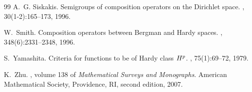 \documentclass[11pt]{amsart}
\numberwithin{equation}{section}
\theoremstyle{definition}
\begin{document}
\begin{thebibliography}{99}
		A.~G. Siskakis.
		\newblock Semigroups of composition operators on the {D}irichlet space.
		, 30(1-2):165--173, 1996.
		
		W.~Smith.
		\newblock Composition operators between {B}ergman and {H}ardy spaces.
		, 348(6):2331--2348, 1996.
		
		S.~Yamashita.
		\newblock Criteria for functions to be of {H}ardy class {$H\sp{p}$}.
		, 75(1):69--72, 1979.
		
		K.~Zhu.
		, volume 138 of {\em Mathematical Surveys and Monographs}.
		\newblock American Mathematical Society, Providence, RI, second edition, 2007.
		
	\end{thebibliography}
\end{document}
